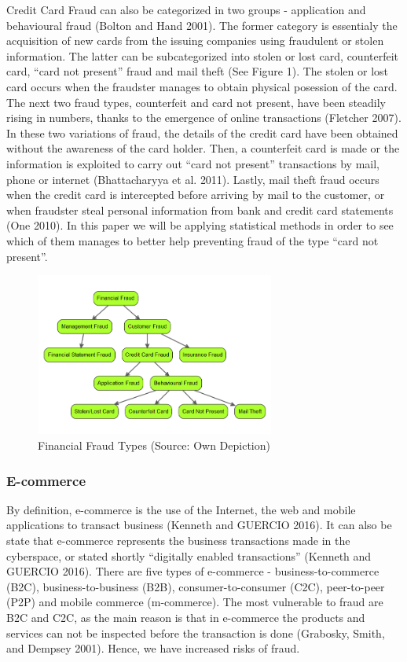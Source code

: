 \documentclass[12pt,]{article}
\begin{document}
Credit Card Fraud can also be categorized in two groups - application
and behavioural fraud (Bolton and Hand 2001). The former category is
essentialy the acquisition of new cards from the issuing companies using
fraudulent or stolen information. The latter can be subcategorized into
stolen or lost card, counterfeit card, ``card not present'' fraud and
mail theft (See Figure 1). The stolen or lost card occurs when the
fraudster manages to obtain physical posession of the card. The next two
fraud types, counterfeit and card not present, have been steadily rising
in numbers, thanks to the emergence of online transactions (Fletcher
2007). In these two variations of fraud, the details of the credit card
have been obtained without the awareness of the card holder. Then, a
counterfeit card is made or the information is exploited to carry out
``card not present'' transactions by mail, phone or internet
(Bhattacharyya et al. 2011). Lastly, mail theft fraud occurs when the
credit card is intercepted before arriving by mail to the customer, or
when fraudster steal personal information from bank and credit card
statements (One 2010). In this paper we will be applying statistical
methods in order to see which of them manages to better help preventing
fraud of the type ``card not present''.

\begin{figure}
\centering
\includegraphics[width=0.7\textwidth,height=\textheight]{figures/fraud_hierarchy.png}
\caption{Financial Fraud Types (Source: Own Depiction)}
\end{figure}

\hypertarget{e-commerce}{%
\subsubsection{E-commerce}\label{e-commerce}}

By definition, e-commerce is the use of the Internet, the web and mobile
applications to transact business (Kenneth and GUERCIO 2016). It can
also be state that e-commerce represents the business transactions made
in the cyberspace, or stated shortly ``digitally enabled transactions''
(Kenneth and GUERCIO 2016). There are five types of e-commerce -
business-to-commerce (B2C), business-to-business (B2B),
consumer-to-consumer (C2C), peer-to-peer (P2P) and mobile commerce
(m-commerce). The most vulnerable to fraud are B2C and C2C, as the main
reason is that in e-commerce the products and services can not be
inspected before the transaction is done (Grabosky, Smith, and Dempsey
2001). Hence, we have increased risks of fraud.
\end{document}
